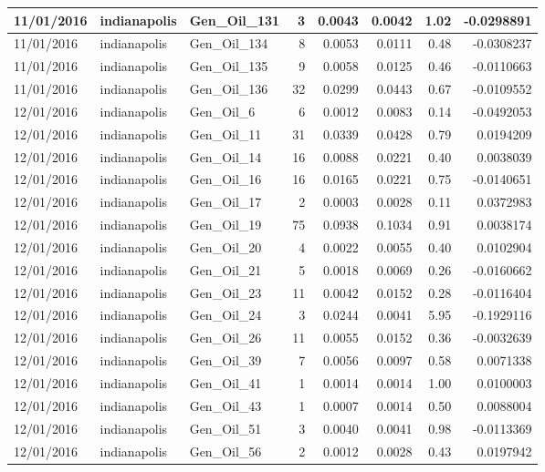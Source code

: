 \documentclass[
  letterpaper,
  DIV=11,
  numbers=noendperiod]{scrartcl}
\begin{document}
\begin{tabular}{l|l|l|r|r|r|r|r}
\hline
11/01/2016 & indianapolis & Gen\_Oil\_131 & 3 & 0.0043 & 0.0042 & 1.02 & -0.0298891\\
\hline
11/01/2016 & indianapolis & Gen\_Oil\_134 & 8 & 0.0053 & 0.0111 & 0.48 & -0.0308237\\
\hline
11/01/2016 & indianapolis & Gen\_Oil\_135 & 9 & 0.0058 & 0.0125 & 0.46 & -0.0110663\\
\hline
11/01/2016 & indianapolis & Gen\_Oil\_136 & 32 & 0.0299 & 0.0443 & 0.67 & -0.0109552\\
\hline
12/01/2016 & indianapolis & Gen\_Oil\_6 & 6 & 0.0012 & 0.0083 & 0.14 & -0.0492053\\
\hline
12/01/2016 & indianapolis & Gen\_Oil\_11 & 31 & 0.0339 & 0.0428 & 0.79 & 0.0194209\\
\hline
12/01/2016 & indianapolis & Gen\_Oil\_14 & 16 & 0.0088 & 0.0221 & 0.40 & 0.0038039\\
\hline
12/01/2016 & indianapolis & Gen\_Oil\_16 & 16 & 0.0165 & 0.0221 & 0.75 & -0.0140651\\
\hline
12/01/2016 & indianapolis & Gen\_Oil\_17 & 2 & 0.0003 & 0.0028 & 0.11 & 0.0372983\\
\hline
12/01/2016 & indianapolis & Gen\_Oil\_19 & 75 & 0.0938 & 0.1034 & 0.91 & 0.0038174\\
\hline
12/01/2016 & indianapolis & Gen\_Oil\_20 & 4 & 0.0022 & 0.0055 & 0.40 & 0.0102904\\
\hline
12/01/2016 & indianapolis & Gen\_Oil\_21 & 5 & 0.0018 & 0.0069 & 0.26 & -0.0160662\\
\hline
12/01/2016 & indianapolis & Gen\_Oil\_23 & 11 & 0.0042 & 0.0152 & 0.28 & -0.0116404\\
\hline
12/01/2016 & indianapolis & Gen\_Oil\_24 & 3 & 0.0244 & 0.0041 & 5.95 & -0.1929116\\
\hline
12/01/2016 & indianapolis & Gen\_Oil\_26 & 11 & 0.0055 & 0.0152 & 0.36 & -0.0032639\\
\hline
12/01/2016 & indianapolis & Gen\_Oil\_39 & 7 & 0.0056 & 0.0097 & 0.58 & 0.0071338\\
\hline
12/01/2016 & indianapolis & Gen\_Oil\_41 & 1 & 0.0014 & 0.0014 & 1.00 & 0.0100003\\
\hline
12/01/2016 & indianapolis & Gen\_Oil\_43 & 1 & 0.0007 & 0.0014 & 0.50 & 0.0088004\\
\hline
12/01/2016 & indianapolis & Gen\_Oil\_51 & 3 & 0.0040 & 0.0041 & 0.98 & -0.0113369\\
\hline
12/01/2016 & indianapolis & Gen\_Oil\_56 & 2 & 0.0012 & 0.0028 & 0.43 & 0.0197942\\

\end{tabular}
\end{document}
